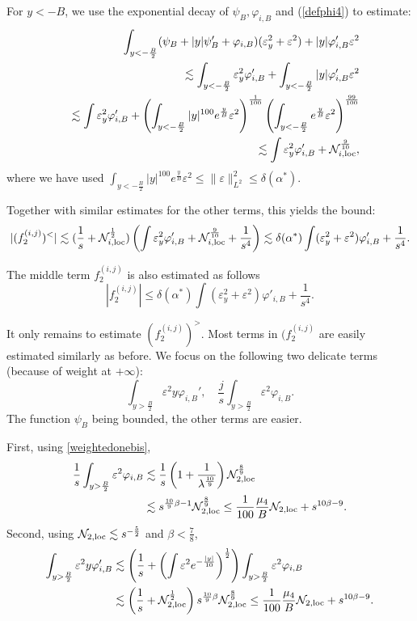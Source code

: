 \documentclass[11pt,a4paper,reqno]{amsart}
\theoremstyle{remark}
\numberwithin{equation}{section}
\newcommand{\bee}{\begin{eqnarray*}}
\newcommand{\eee}{\end{eqnarray*}}
\def\fref#1{{\rm (\ref{#1})}}
\def\e{\varepsilon}
\def\fref#1{{\rm (\ref{#1})}}
\def\l{\lambda}
\begin{document}
  For $y<-B$, we use the exponential decay of $\psi_B, \varphi_{i,B}$ and   \fref{defphi4}
to estimate:
\bee
&&\int_{y<-\frac B2}(\psi_B+|y|\psi'_B+\varphi_{i,B})(\e_y^2+\e^2) +|y|\varphi'_{i,B} \e^2\\
&& \lesssim  \int_{y<-\frac B2} \e_y^2 \varphi'_{i,B}+\int_{y<-\frac B2}|y|\varphi'_{i,B}\e^2\\
&&\lesssim  \int   \varepsilon_y^2    \varphi'_{i,B}  + \left(\int_{y<-\frac B2}|y|^{100}e^{\frac yB}\e^2\right)^{\frac{1}{100}}\left(\int_{y<-\frac B2}e^{\frac yB}\e^2\right)^{\frac{99}{100}} \\
&& \lesssim \int   \varepsilon_y^2    \varphi'_{i,B} +\mathcal{N}_{i,\rm loc}^{\frac{9}{10}},
\eee
where we have used $\int_{y<-\frac B2}|y|^{100}e^{\frac yB}\e^2\leq \|\e\|_{L^2}^2\leq \delta(\alpha^*)$.

 Together with similar estimates for the other terms,
this yields the bound:
$$|(f_2^{(i,j)})^<|\lesssim (\frac 1s+\mathcal{N}_{i,\rm loc}^{\frac 12})\left(\int   \varepsilon_y^2    \varphi'_{i,B} +\mathcal{N}_{i,\rm loc}^{\frac{9}{10}}+\frac 1{s^4}\right)\lesssim \delta(\alpha^*) \int  ( \varepsilon_y^2 +\e^2)   \varphi'_{i,B}  +
\frac 1{s^4}.$$

The middle term $f_{2}^{(i,j)}$ is also   estimated as follows
$$
|f_{2}^{(i,j)}|\leq \delta(\alpha^*) \int  ( \varepsilon_y^2 +\e^2)   \varphi'_{i,B}  +
\frac 1{s^4}.
$$

 
It only remains to estimate $(f_{2}^{(i,j)})^>$.
Most terms in $(f_{2}^{(i,j)}$ are easily estimated similarly as before. We focus on the following two delicate terms (because of weight at $+\infty$):
$$\int_{y> \frac B2}   \e^2    y\varphi_{i,B}', \quad
\frac j{s} \int_{y>\frac B2} \e^2 \varphi_{i,B}.$$
The function $\psi_B$ being bounded, the other terms are easier.

First, using \eqref{weightedonebis},
\begin{align*}
 \frac 1 s\int_{y>\frac B2} \e^2 \varphi_{i,B} & \lesssim
\frac 1s \left( 1+ \frac 1{\l^{\frac {10}9}}\right) \mathcal N_{2,\rm loc}^{\frac 89}\\
& \lesssim s^{\frac {10}9 \beta -1}\mathcal N_{2,\rm loc}^{\frac 89} 
\leq \frac 1 {100} \frac {\mu_4}{B} \mathcal N_{2, \rm loc} + s^{10 \beta -9}.
\end{align*}
Second, using $\mathcal N_{2,\rm loc}  \lesssim s^{-\frac 52 }$ and
$\beta<\frac 78$,
\begin{align*}
\int_{y> \frac B2}   \e^2    y\varphi_{i,B}' & \lesssim  \left(\frac 1s + \left( \int \e^2 e^{-\frac{|y|}{10}}\right)^{\frac 12} \right) \int_{y>\frac B2}   \e^2 \varphi_{i,B}\\
& \lesssim  \left(\frac 1s + \mathcal N_{2,\rm loc}^{\frac 12}  \right) s^{\frac {10}9 \beta }\mathcal N_{2,\rm loc}^{\frac 89} \leq \frac 1 {100} \frac {\mu_4}{B} \mathcal N_{2, \rm loc} + s^{10 \beta -9}.
\end{align*}
\end{document}
